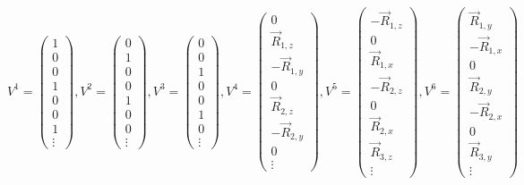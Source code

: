 \documentclass[11pt]{scrartcl} %
\begin{document}
\begin{equation}
	V^1=\begin{pmatrix} 1\\0\\0\\1\\0\\0\\1\\ \vdots\end{pmatrix},
	V^2=\begin{pmatrix} 0\\1\\0\\0\\1\\0\\0\\ \vdots\end{pmatrix},
	V^3=\begin{pmatrix} 0\\0\\1\\0\\0\\1\\0\\ \vdots\end{pmatrix},
	V^4=\begin{pmatrix}0 \\ \vec{R}_{1,z} \\ -\vec{R}_{1,y} \\ 0 \\ \vec{R}_{2,z} \\ -\vec{R}_{2,y} \\ 0 \\ \vdots \end{pmatrix},
	V^5=\begin{pmatrix}-\vec{R}_{1,z} \\ 0 \\ \vec{R}_{1,x} \\ -\vec{R}_{2,z} \\ 0 \\ \vec{R}_{2,x} \\ \vec{R}_{3,z} \\ \vdots\end{pmatrix},
	V^6=\begin{pmatrix}\vec{R}_{1,y}\\-\vec{R}_{1,x}\\0\\\vec{R}_{2,y}\\-\vec{R}_{2,x}\\0\\\vec{R}_{3,y}\\\vdots\end{pmatrix}
\end{equation}
\end{document}
